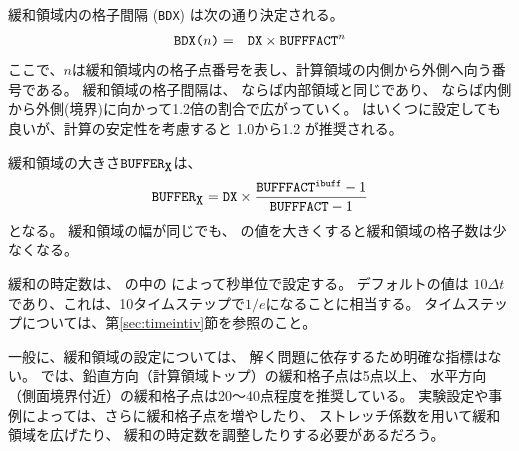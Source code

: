 緩和領域内の格子間隔 (\verb|BDX|) は次の通り決定される。
\begin{eqnarray}
 \verb|BDX(|n\verb|)| &=& \verb|DX| \times \verb|BUFFFACT|^n \nonumber
\end{eqnarray}
ここで、$n$は緩和領域内の格子点番号を表し、計算領域の内側から外側へ向う番号である。
緩和領域の格子間隔は、
ならば内部領域と同じであり、
ならば内側から外側(境界)に向かって1.2倍の割合で広がっていく。
はいくつに設定しても良いが、計算の安定性を考慮すると 1.0から1.2 が推奨される。


緩和領域の大きさ$\verb|BUFFER|_{\verb|X|}$は、
\[
  \verb|BUFFER|_{\verb|X|} = \nmitemeq{DX} \times \frac{ \nmitemeq{BUFFFACT}^{\texttt{\detokenize{ibuff}}}-1}{ \nmitemeq{BUFFFACT}-1 }
\]
となる。
%
緩和領域の幅が同じでも、
の値を大きくすると緩和領域の格子数は少なくなる。


緩和の時定数は、
の中の
によって秒単位で設定する。
デフォルトの値は $10 \Delta t$ であり、これは、10タイムステップで$1/e$になることに相当する。
タイムステップについては、第\ref{sec:timeintiv}節を参照のこと。


一般に、緩和領域の設定については、
解く問題に依存するため明確な指標はない。
\scalerm では、鉛直方向（計算領域トップ）の緩和格子点は5点以上、
水平方向（側面境界付近）の緩和格子点は20〜40点程度を推奨している。
実験設定や事例によっては、さらに緩和格子点を増やしたり、
ストレッチ係数を用いて緩和領域を広げたり、
緩和の時定数を調整したりする必要があるだろう。